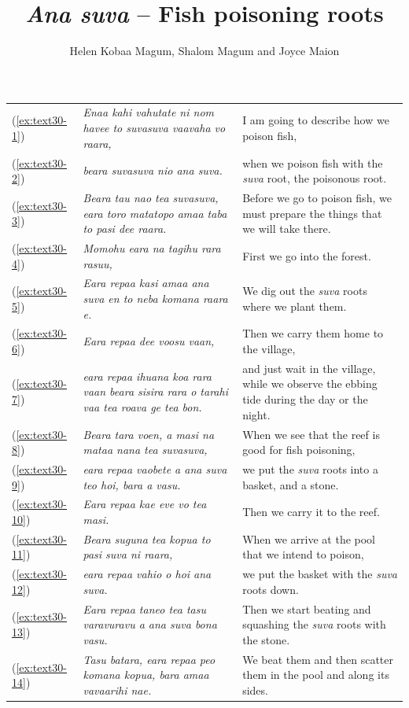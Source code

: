\documentclass[output=paper]{langscibook}
\title{\textit{Ana suva} – Fish poisoning roots}
\author{Helen Kobaa Magum, Shalom Magum and Joyce Maion}
\begin{document}
\maketitle\label{chap:37}
\begin{xltabular}{\textwidth}{lXX}
	(\ref{ex:text30-1})&\textit{Enaa kahi vahutate ni nom havee to suvasuva vaavaha vo raara,}&I am going to describe how we poison fish,\\
	(\ref{ex:text30-2})&\textit{beara suvasuva nio ana suva.}&when we poison fish with the \textit{suva} root, the poisonous root.\\
	(\ref{ex:text30-3})&\textit{Beara tau nao tea suvasuva, eara toro matatopo amaa taba to pasi dee raara.}&Before we go to poison fish, we must prepare the things that we will take there.\\
	(\ref{ex:text30-4})&\textit{Momohu eara na tagihu rara rasuu,}&First we go into the forest.\\
	(\ref{ex:text30-5})&\textit{Eara repaa kasi amaa ana suva en to neba komana raara e.}&We dig out the \textit{suva} roots where we plant them.\\
	(\ref{ex:text30-6})&\textit{Eara repaa dee voosu vaan,}&Then we carry them home to the village,\\
	(\ref{ex:text30-7})&\textit{eara repaa ihuana koa rara vaan beara sisira rara o tarahi vaa tea roava ge tea bon.}&and just wait in the village, while we observe the ebbing tide during the day or the night.\\
	(\ref{ex:text30-8})&\textit{Beara tara voen, a masi na mataa nana tea suvasuva,}&When we see that the reef is good for fish poisoning,\\
	(\ref{ex:text30-9})&\textit{eara repaa vaobete a ana suva teo hoi, bara a vasu.}&we put the \textit{suva} roots into a basket, and a stone.\\
	(\ref{ex:text30-10})&\textit{Eara repaa kae eve vo tea masi.}&Then we carry it to the reef.\\
	(\ref{ex:text30-11})&\textit{Beara suguna tea kopua to pasi suva ni raara,}&When we arrive at the pool that we intend to poison,\\
	(\ref{ex:text30-12})&\textit{eara repaa vahio o hoi ana suva.}&we put the basket with the \textit{suva} roots down.\\
	(\ref{ex:text30-13})&\textit{Eara repaa taneo tea tasu varavuravu a ana suva bona vasu.}&Then we start beating and squashing the \textit{suva} roots with the stone.\\
	(\ref{ex:text30-14})&\textit{Tasu batara, eara repaa peo komana kopua, bara amaa vavaarihi nae.}&We beat them and then scatter them in the pool and along its sides.\\

\end{xltabular}
\end{document}
